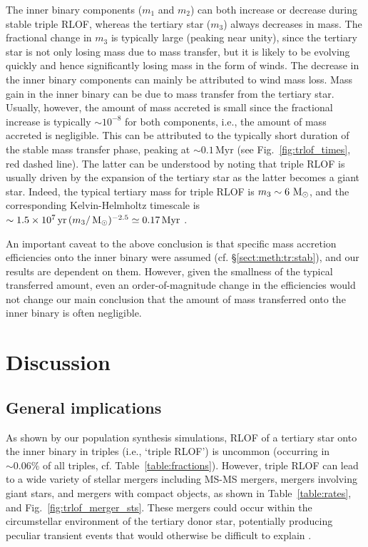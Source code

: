 \documentclass[twocolumn,appendixfloats,tighten]{aastex631}
\def\msun{{\rm\,M_\odot}}
\newcommand{\F}{Fig.}
\newcommand{\myr}{\mathrm{Myr}}
\newcommand{\yr}{\mathrm{yr}}
\begin{document}
The inner binary components ($m_1$ and $m_2$) can both increase or decrease during stable triple RLOF, whereas the tertiary star ($m_3$) always decreases in mass. The fractional change in $m_3$ is typically large (peaking near unity), since the tertiary star is not only losing mass due to mass transfer, but it is likely to be evolving quickly and hence significantly losing mass in the form of winds. The decrease in the inner binary components can mainly be attributed to wind mass loss. Mass gain in the inner binary can be due to mass transfer from the tertiary star. Usually, however, the amount of mass accreted is small since the fractional increase is typically $\sim 10^{-8}$ for both components, i.e., the amount of mass accreted is negligible. This can be attributed to the typically short duration of the stable mass transfer phase, peaking at $\sim 0.1 \,\myr$ (see \F~\ref{fig:trlof_times}, red dashed line). The latter can be understood by noting that triple RLOF is usually driven by the expansion of the tertiary star as the latter becomes a giant star. Indeed, the typical tertiary mass for triple RLOF is $m_3\sim 6\,\msun$, and the corresponding Kelvin-Helmholtz timescale is $\sim 1.5\times 10^7\,\yr \, (m_3/\msun)^{-2.5} \simeq 0.17\,\myr$ \citep[e.g.,][]{1994sse..book.....K}. 

An important caveat to the above conclusion is that specific mass accretion efficiencies onto the inner binary were assumed (cf. \S\ref{sect:meth:tr:stab}), and our results are dependent on them. However, given the smallness of the typical transferred amount, even an order-of-magnitude change in the efficiencies would not change our main conclusion that the amount of mass transferred onto the inner binary is often negligible. 



\section{Discussion}
\label{sect:dis}

\subsection{General implications}
\label{sect:dis:gen}
As shown by our population synthesis simulations, RLOF of a tertiary star onto the inner binary in triples (i.e., `triple RLOF') is uncommon (occurring in $\sim 0.06\%$ of all triples, cf. Table~\ref{table:fractions}). However, triple RLOF can lead to a wide variety of stellar mergers including MS-MS mergers, mergers involving giant stars, and mergers with compact objects, as shown in Table~\ref{table:rates}, and \F~\ref{fig:trlof_merger_sts}. These mergers could occur within the circumstellar environment of the tertiary donor star, potentially producing peculiar transient events that would otherwise be difficult to explain \citep[e.g.,][]{2021MNRAS.504.5967S}.
\end{document}
